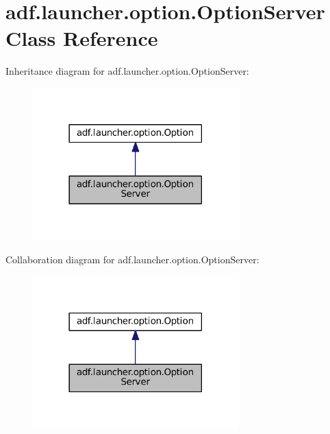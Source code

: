\hypertarget{classadf_1_1launcher_1_1option_1_1OptionServer}{}\section{adf.\+launcher.\+option.\+Option\+Server Class Reference}
\label{classadf_1_1launcher_1_1option_1_1OptionServer}


Inheritance diagram for adf.\+launcher.\+option.\+Option\+Server\+:
\nopagebreak
\begin{figure}[H]
\begin{center}
\leavevmode
\includegraphics[width=225pt]{classadf_1_1launcher_1_1option_1_1OptionServer__inherit__graph}
\end{center}
\end{figure}


Collaboration diagram for adf.\+launcher.\+option.\+Option\+Server\+:
\nopagebreak
\begin{figure}[H]
\begin{center}
\leavevmode
\includegraphics[width=225pt]{classadf_1_1launcher_1_1option_1_1OptionServer__coll__graph}
\end{center}
\end{figure}
